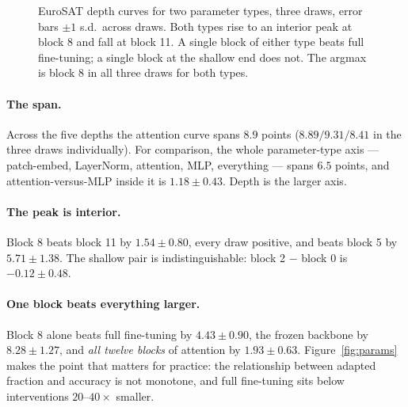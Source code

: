 \documentclass[11pt]{article}
\newcommand{\dd}[2]{$#1 \pm #2$}
\begin{document}
\begin{figure}[t]
\centering
{}
\caption{EuroSAT depth curves for two parameter types, three draws, error bars
$\pm 1$ s.d.\ across draws. Both types rise to an interior peak at block 8 and fall at
block 11. A single block of either type beats full fine-tuning; a single block at the
shallow end does not. The argmax is block 8 in all three draws for both types.}
\label{fig:depth}
\end{figure}

\paragraph{The span.} Across the five depths the attention curve spans $8.9$ points
($8.89/9.31/8.41$ in the three draws individually). For comparison, the whole
parameter-type axis --- patch-embed, LayerNorm, attention, MLP, everything --- spans
$6.5$ points, and attention-versus-MLP inside it is \dd{1.18}{0.43}. Depth is the
larger axis.

\paragraph{The peak is interior.} Block 8 beats block 11 by \dd{1.54}{0.80}, every draw
positive, and beats block 5 by $5.71 \pm 1.38$. The shallow pair is
indistinguishable: block 2 $-$ block 0 is $-0.12 \pm 0.48$.

\paragraph{One block beats everything larger.}
Block 8 alone beats full fine-tuning by \dd{4.43}{0.90}, the frozen backbone by
\dd{8.28}{1.27}, and \emph{all twelve blocks} of attention by \dd{1.93}{0.63}.
Figure~\ref{fig:params} makes the point that matters for practice: the relationship
between adapted fraction and accuracy is not monotone, and full fine-tuning sits below
interventions $20$--$40\times$ smaller.
\end{document}

